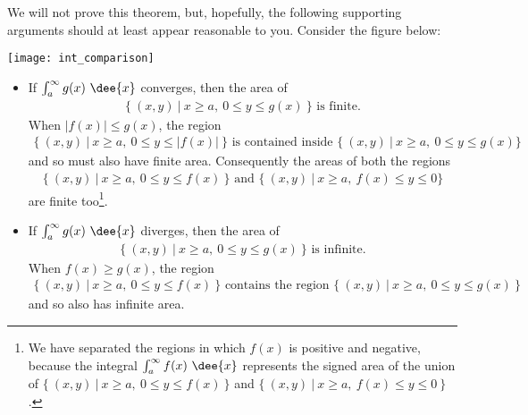 We will not prove this theorem, but, hopefully, the following supporting
arguments should at least appear reasonable to you. Consider the figure below:
\begin{efig}
 \centering
\texttt{[image: int\_comparison]}
\end{efig}

\begin{itemize}
\item If $\int_a^\infty g(x)\ \dee{x}$ converges, then the area of
\begin{align*}
\big\{\ (x,y)\ \big|\ x\ge a,\ 0\le y\le g(x)\ \big\} \text{ is finite.}
\end{align*}
When $|f(x)|\le g(x)$, the region
\begin{align*}
\big\{\ (x,y)\ \big|\ x\ge a,\ 0\le y\le |f(x)|\ \big\}
\text{ is contained inside }
\big\{\ (x,y)\ \big|\ x\ge a,\ 0\le y\le g(x)\big\}
\end{align*}
and so must also have finite area. Consequently the areas
of both the regions
\begin{align*}
\big\{\ (x,y)\ \big|\ x\ge a,\ 0\le y\le f(x)\ \big\}
\text{ and }
\big\{\ (x,y)\ \big|\ x\ge a,\ f(x)\le y\le 0 \big\}
\end{align*}
are finite too\footnote{We have separated the regions in which $f(x)$ is
positive and negative, because the integral $\int_a^\infty f(x)\ \dee{x}$
represents the signed area of the union of  $\big\{\ (x,y)\ \big|\ x\ge a,\ 0\le
y\le f(x)\ \big\}$ and $\big\{\ (x,y)\ \big|\ x\ge a,\ f(x)\le y\le 0\
\big\}$.}.

\item If $\int_a^\infty g(x)\ \dee{x}$ diverges, then the area of
\begin{align*}
\big\{\ (x,y)\ \big|\ x\ge a,\ 0\le y\le g(x)\ \big\} \text{ is infinite.}
\end{align*}
When $f(x)\ge g(x)$, the region
\begin{align*}
\big\{\ (x,y)\ \big|\ x\ge a,\ 0\le y\le f(x)\ \big\}
\text{ contains the region }
\big\{\ (x,y)\ \big|\ x\ge a,\ 0\le y\le g(x)\ \big\}
\end{align*}
and so also has infinite area.
\end{itemize}

